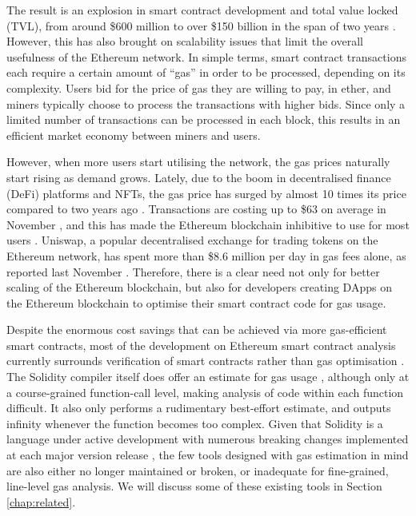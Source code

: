 The result is an explosion in smart contract development and total
value locked (TVL), from around \$600 million to over \$150 billion in the
span of two years \cite{defillama}. However, this 
has also brought on scalability issues that limit the overall usefulness
of the Ethereum network. In simple terms, smart contract transactions 
each require a certain amount of ``gas'' in order to be processed, 
depending on its complexity. Users bid for the price of gas they are
willing to pay, in ether, and miners typically choose to process the 
transactions with higher bids. Since only a limited number of transactions
can be processed in each block, this results in an efficient market
economy between miners and users. 

However, when more users start utilising the network, the gas prices
naturally start rising as demand grows. Lately, due to the boom in decentralised 
finance (DeFi) platforms and NFTs, the gas price has 
surged by almost 10 times its price compared to two years ago \cite{gashistory}. 
Transactions are costing up to \$63 on average in November \cite{gasfee1}, and this has made the
Ethereum blockchain inhibitive to use for most users \cite{gasfee2}.  
Uniswap, a popular decentralised exchange for trading tokens on the Ethereum network,
has spent more than \$8.6 million per day in gas fees alone, as reported last November \cite{gasusageperday}.
Therefore, there is a clear need not only for better scaling of the Ethereum blockchain, but 
also for developers creating DApps on the Ethereum blockchain to optimise their 
smart contract code for gas usage.

Despite the enormous cost savings that can be achieved via more gas-efficient smart contracts, 
most of the development on Ethereum smart contract analysis currently
surrounds verification of smart contracts rather than gas optimisation \cite{smartcontracttools}.
The Solidity compiler itself does offer an estimate for gas usage \cite{soliditydocs}, although only at a 
course-grained function-call level, making analysis of code within each function difficult.
It also only performs a rudimentary best-effort estimate, and outputs infinity whenever the
function becomes too complex. Given that Solidity is a language under active development
with numerous breaking changes implemented at each major version release \cite{solidity07breaking} \cite{solidity08breaking}, the few tools
designed with gas estimation in mind are also either no longer maintained or broken, or
inadequate for fine-grained, line-level gas analysis. We will discuss some of these existing
tools in Section \ref{chap:related}.

